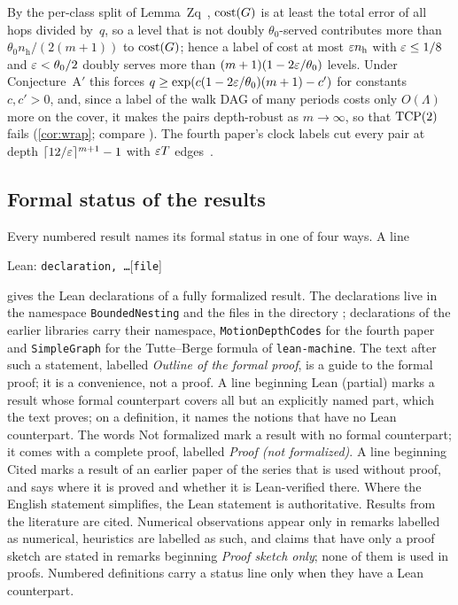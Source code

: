 By the per-class split of Lemma~Zq~\cite[Corollary~5.16]{FourthPaper2026}, $\mathrm{cost}(G)$ is at least the total error of
all hops divided by~$q$, so a level that is not doubly $\theta_0$-served contributes more than
$\theta_0n_{\mathrm h}/(2(m+1))$ to $\mathrm{cost}(G)$; hence a label of cost at most $\varepsilon n_{\mathrm h}$ with $\varepsilon\le1/8$ and
$\varepsilon<\theta_0/2$ doubly serves more than $(m+1)(1-2\varepsilon/\theta_0)$ levels. Under
Conjecture~A$'$ this forces $q\ge\exp(c(1-2\varepsilon/\theta_0)(m+1)-c')$ for constants $c,c'>0$, and, since a label of the walk DAG of many periods costs only $O(\Lambda)$ more on the cover, it makes the pairs
depth-robust as $m\to\infty$, so that $\mathrm{TCP}(2)$ fails (\cref{cor:wrap}; compare \cite[Section~5.7]{FourthPaper2026}). The fourth paper's clock labels cut every pair at depth $\lceil12/\varepsilon\rceil^{m+1}-1$
with $\varepsilon T$ edges~\cite[Proposition~5.13]{FourthPaper2026}.

\subsection{Formal status of the results}\label{sec:prelim-lean}

Every numbered result names its formal status in one of four ways. A line
\begin{center}
{\small\textsf{Lean:} \texttt{declaration, \dots}\hfill[\texttt{file}]}
\end{center}
gives the Lean declarations of a fully formalized result. The declarations live in the namespace
\texttt{BoundedNesting} and the files in the directory ; declarations of the earlier libraries
carry their namespace, \texttt{MotionDepthCodes} for the fourth paper and \texttt{SimpleGraph} for the Tutte--Berge formula
of \texttt{lean-machine}. The text after such a statement,
labelled \emph{Outline of the formal proof}, is a guide to the formal proof; it is a convenience, not a proof. A line
beginning \textsf{Lean (partial)} marks a result whose formal counterpart covers all but an explicitly named part, which
the text proves; on a definition, it names the notions that have no Lean counterpart. The words \textsf{Not formalized} mark a result with no formal counterpart; it comes with a complete
proof, labelled \emph{Proof (not formalized)}. A line beginning \textsf{Cited} marks a result of an earlier paper of the
series that is used without proof, and says where it is proved and whether it is Lean-verified there. Where the English
statement simplifies, the Lean statement is authoritative. Results from the literature are cited. Numerical observations
appear only in remarks labelled as numerical, heuristics are labelled as such, and claims that have only a proof sketch are
stated in remarks beginning \emph{Proof sketch only}; none of them is used in proofs. Numbered definitions carry a status line
only when they have a Lean counterpart.

